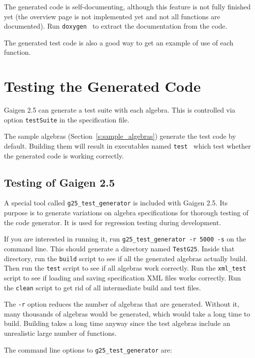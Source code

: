 \documentclass[10pt, a4paper]{article}
\begin{document}
The generated code is self-documenting, although this
feature is not fully finished yet (the overview page
is not implemented yet and not all functions are documented). Run {\tt doxygen } to extract
the documentation from the code.

The generated test code is also a good way to get an example
of use of each function.


\section{Testing the Generated Code}

Gaigen 2.5 can generate a test suite with each algebra.
This is controlled via option {\tt testSuite} in the specification file.

The sample algebras (Section~\ref{s:sample_algebras}) generate the test 
code by default. Building them will result in executables named 
{\tt test } which test whether the generated code is working correctly. 


\subsection{Testing of Gaigen 2.5}

A special tool called {\tt g25\_test\_generator} is included with Gaigen 2.5.
Its purpose is to generate variations on algebra specifications for thorough testing
of the code generator. It is used for regression testing during development. 

If you are interested in running it, run {\tt g25\_test\_generator -r 5000 -s} on
the command line.
This should generate a directory named {\tt TestG25}. 
Inside that directory, run the {\tt build} script to see if all the
generated algebras actually build. Then run the {\tt test} script to see if
all algebras work correctly. Run the {\tt xml\_test} script to see if
loading and saving specification XML files works correctly.
Run the {\tt clean} script to get rid of all intermediate build and test
files.

The {\tt -r} option reduces the number of algebras that are generated. Without it,
many thousands of algebras would be generated, which would take a long time to build.
Building takes a long time anyway since the test algebras include an unrealistic
large number of functions.

The command line options to {\tt g25\_test\_generator} are:
\vspace*{2mm}
\end{document}
